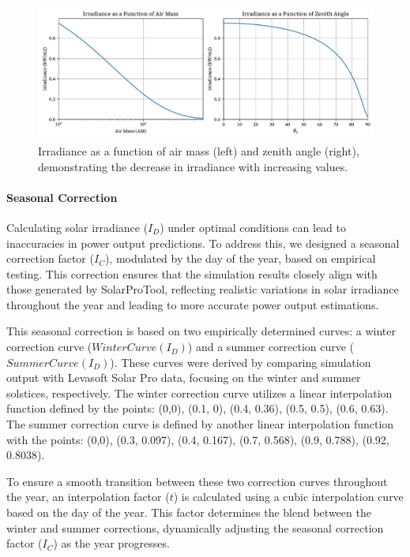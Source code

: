 \documentclass[draft, final]{vutinfth} %
\begin{document}
\begin{figure}[h]
    \centering
    \includegraphics[width=\textwidth]{graphics/irradiance.pdf}
    \caption{Irradiance as a function of air mass (left) and zenith angle (right), demonstrating the decrease in irradiance with increasing values.}
    \label{fig:irradiance}
\end{figure}

\paragraph{Seasonal Correction}

Calculating solar irradiance ($I_D$) under optimal conditions can lead to inaccuracies in power output predictions. To address this, we designed a seasonal correction factor ($I_C$), modulated by the day of the year, based on empirical testing. This correction ensures that the simulation results closely align with those generated by SolarProTool, reflecting realistic variations in solar irradiance throughout the year and leading to more accurate power output estimations.

This seasonal correction is based on two empirically determined curves: a winter correction curve ($WinterCurve(I_D)$) and a summer correction curve ($SummerCurve(I_D)$). These curves were derived by comparing simulation output with Levasoft Solar Pro data, focusing on the winter and summer solstices, respectively. The winter correction curve utilizes a linear interpolation function defined by the points: (0,0), (0.1, 0), (0.4, 0.36), (0.5, 0.5), (0.6, 0.63). The summer correction curve is defined by another linear interpolation function with the points: (0,0), (0.3, 0.097), (0.4, 0.167), (0.7, 0.568), (0.9, 0.788), (0.92, 0.8038).

To ensure a smooth transition between these two correction curves throughout the year, an interpolation factor ($t$) is calculated using a cubic interpolation curve based on the day of the year. This factor determines the blend between the winter and summer corrections, dynamically adjusting the seasonal correction factor ($I_C$) as the year progresses.
\end{document}
